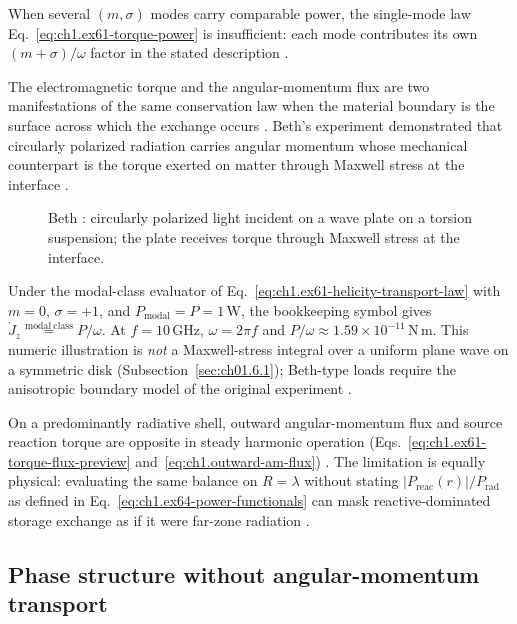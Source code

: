 When several \((m,\sigma)\) modes carry comparable power, the single-mode law
Eq.~\eqref{eq:ch1.ex61-torque-power} is insufficient: each mode contributes its own
\((m+\sigma)/\omega\) factor in the stated description \cite{stratton1941}.

The electromagnetic torque and the angular-momentum flux are two manifestations of the same conservation law when the material boundary is the surface across which the exchange occurs \cite{beth1936}. Beth's experiment demonstrated that circularly polarized radiation carries angular momentum whose mechanical counterpart is the torque exerted on matter through Maxwell stress at the interface \cite{beth1936}.

\begin{figure}[t]
\centering
\VolIPhysFig{\VolIPhysBethSchematic}
\caption{Beth \cite{beth1936}: circularly polarized light incident on a wave plate on a torsion suspension; the plate receives torque through Maxwell stress at the interface.}
\label{fig:ch1.beth-schematic}
\end{figure}

\begin{example}
\label{ex:ch1.beth-torque}
Under the modal-class evaluator of Eq.~\eqref{eq:ch1.ex61-helicity-transport-law} with $m=0$, $\sigma=+1$, and $P_{\mathrm{modal}}=P=1\,\mathrm{W}$, the bookkeeping symbol gives $\dot J_z\stackrel{\mathrm{modal\ class}}{=}P/\omega$. At $f=10\,\mathrm{GHz}$, $\omega=2\pi f$ and $P/\omega\approx1.59\times10^{-11}\,\mathrm{N\,m}$. This numeric illustration is \emph{not} a Maxwell-stress integral over a uniform plane wave on a symmetric disk (Subsection~\ref{sec:ch01.6.1}); Beth-type loads require the anisotropic boundary model of the original experiment \cite{beth1936,stratton1941}.
\end{example}

On a predominantly radiative shell, outward angular-momentum flux and source reaction torque are opposite in steady harmonic operation (Eqs.~\eqref{eq:ch1.ex61-torque-flux-preview} and~\eqref{eq:ch1.outward-am-flux}) \cite{beth1936}. The limitation is equally physical: evaluating the same balance on
\(R=\lambda\) without stating \(|P_{\mathrm{reac}}(r)|/P_{\mathrm{rad}}\) as defined in Eq.~\eqref{eq:ch1.ex64-power-functionals} can
mask reactive-dominated storage exchange as if it were far-zone radiation \cite{stratton1941}.

\subsection{Phase structure without angular-momentum transport}
\label{sec:ch01.6.2}

